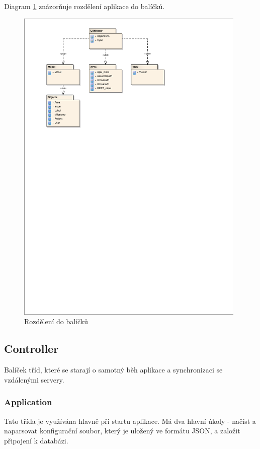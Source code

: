 Diagram \ref{fig:class-model} znázorňuje rozdělení aplikace do balíčků.

\begin{figure}[h]
\begin{center}
	\includegraphics[width=11cm,scale=1,trim=20mm 185mm 60mm 10mm, clip]{figures/class-model}
	\caption{Rozdělení do balíčků}
	\label{fig:class-model}
\end{center}
\end{figure}

\subsection{Controller}

Balíček tříd, které se starají o samotný běh aplikace a synchronizaci se vzdálenými servery.

\subsubsection{Application}

Tato třída je využívána hlavně při startu aplikace. Má dva hlavní úkoly - načíst a naparsovat konfigurační soubor, který je uložený ve formátu JSON, a založit připojení k databázi.

